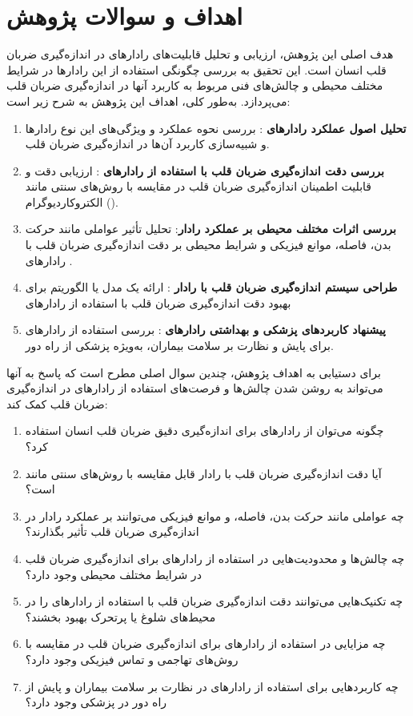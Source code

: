 
\section{اهداف و سوالات پژوهش}\label{sec1}



هدف اصلی این پژوهش، ارزیابی و تحلیل قابلیت‌های رادارهای  در اندازه‌گیری ضربان قلب انسان است. این تحقیق به بررسی چگونگی استفاده از این رادارها در شرایط مختلف محیطی و چالش‌های فنی مربوط به کاربرد آنها در اندازه‌گیری ضربان قلب می‌پردازد. به‌طور کلی، اهداف این پژوهش به شرح زیر است:
\begin{enumerate}
    \item \textbf{تحلیل اصول عملکرد رادارهای }: بررسی نحوه عملکرد و ویژگی‌های این نوع رادارها و شبیه‌سازی کاربرد آن‌ها در اندازه‌گیری ضربان قلب.
    \item \textbf{بررسی دقت اندازه‌گیری ضربان قلب با استفاده از رادارهای }: ارزیابی دقت و قابلیت اطمینان اندازه‌گیری ضربان قلب در مقایسه با روش‌های سنتی مانند الکتروکاردیوگرام ().
    \item \textbf{بررسی اثرات مختلف محیطی بر عملکرد رادار}: تحلیل تأثیر عواملی مانند حرکت بدن، فاصله، موانع فیزیکی و شرایط محیطی بر دقت اندازه‌گیری ضربان قلب با رادارهای .
    \item \textbf{طراحی سیستم اندازه‌گیری ضربان قلب با رادار }: ارائه یک مدل یا الگوریتم برای بهبود دقت اندازه‌گیری ضربان قلب با استفاده از رادارهای  
    \item \textbf{پیشنهاد کاربردهای پزشکی و بهداشتی رادارهای }: بررسی استفاده از رادارهای  برای پایش و نظارت بر سلامت بیماران، به‌ویژه  پزشکی از راه دور.
\end{enumerate}


برای دستیابی به اهداف پژوهش، چندین سوال اصلی مطرح است که پاسخ به آنها می‌تواند به روشن شدن چالش‌ها و فرصت‌های استفاده از رادارهای  در اندازه‌گیری ضربان قلب کمک کند:
\begin{enumerate}
    \item چگونه می‌توان از رادارهای  برای اندازه‌گیری دقیق ضربان قلب انسان استفاده کرد؟
    \item آیا دقت اندازه‌گیری ضربان قلب با رادار  قابل مقایسه با روش‌های سنتی مانند  است؟
    \item چه عواملی مانند حرکت بدن، فاصله، و موانع فیزیکی می‌توانند بر عملکرد رادار  در اندازه‌گیری ضربان قلب تأثیر بگذارند؟
    \item چه چالش‌ها و محدودیت‌هایی در استفاده از رادارهای  برای اندازه‌گیری ضربان قلب در شرایط مختلف محیطی وجود دارد؟
    \item چه تکنیک‌هایی می‌توانند دقت اندازه‌گیری ضربان قلب با استفاده از رادارهای  را در محیط‌های شلوغ یا پرتحرک بهبود بخشند؟
    \item چه مزایایی در استفاده از رادارهای  برای اندازه‌گیری ضربان قلب در مقایسه با روش‌های تهاجمی و تماس فیزیکی وجود دارد؟
    \item چه کاربردهایی برای استفاده از رادارهای  در نظارت بر سلامت بیماران و پایش از راه دور در پزشکی وجود دارد؟
\end{enumerate}